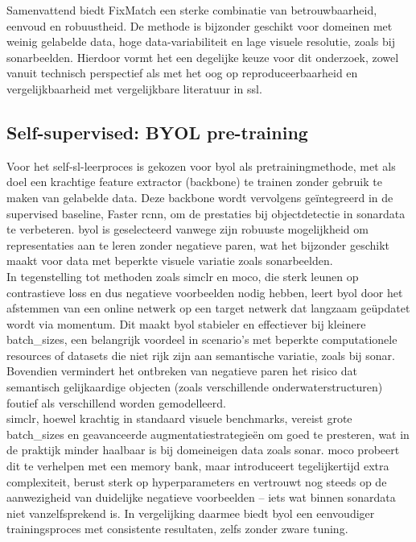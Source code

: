 Samenvattend biedt FixMatch een sterke combinatie van betrouwbaarheid, eenvoud en robuustheid. De methode is bijzonder geschikt voor domeinen met weinig gelabelde data, hoge data-variabiliteit en lage visuele resolutie, zoals bij sonarbeelden. Hierdoor vormt het een degelijke keuze voor dit onderzoek, zowel vanuit technisch perspectief als met het oog op reproduceerbaarheid en vergelijkbaarheid met vergelijkbare literatuur in \gls{ssl}.

\subsection{Self-supervised: BYOL pre-training}

Voor het \gls{self-sl}-leerproces is gekozen voor \gls{byol} als pretrainingmethode, met als doel een krachtige feature extractor (backbone) te trainen zonder gebruik te maken van gelabelde data. Deze backbone wordt vervolgens geïntegreerd in de supervised baseline, Faster \gls{rcnn}, om de prestaties bij objectdetectie in sonardata te verbeteren. \gls{byol} is geselecteerd vanwege zijn robuuste mogelijkheid om representaties aan te leren zonder negatieve paren, wat het bijzonder geschikt maakt voor data met beperkte visuele variatie zoals sonarbeelden. \\

In tegenstelling tot methoden zoals \gls{simclr} en \gls{moco}, die sterk leunen op contrastieve loss en dus negatieve voorbeelden nodig hebben, leert \gls{byol} door het afstemmen van een online netwerk op een target netwerk dat langzaam geüpdatet wordt via momentum. Dit maakt \gls{byol} stabieler en effectiever bij kleinere \glspl{batch_size}, een belangrijk voordeel in scenario's met beperkte computationele resources of datasets die niet rijk zijn aan semantische variatie, zoals bij sonar. Bovendien vermindert het ontbreken van negatieve paren het risico dat semantisch gelijkaardige objecten (zoals verschillende onderwaterstructuren) foutief als verschillend worden gemodelleerd. \\

\gls{simclr}, hoewel krachtig in standaard visuele benchmarks, vereist grote \glspl{batch_size} en geavanceerde augmentatiestrategieën om goed te presteren, wat in de praktijk minder haalbaar is bij domeineigen data zoals sonar. \gls{moco} probeert dit te verhelpen met een memory bank, maar introduceert tegelijkertijd extra complexiteit, berust sterk op hyperparameters en vertrouwt nog steeds op de aanwezigheid van duidelijke negatieve voorbeelden -- iets wat binnen sonardata niet vanzelfsprekend is. In vergelijking daarmee biedt \gls{byol} een eenvoudiger trainingsproces met consistente resultaten, zelfs zonder zware tuning. \\

